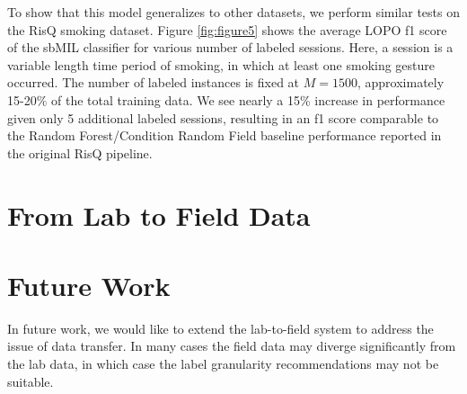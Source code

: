 \documentclass{sigchi}
\begin{document}
To show that this model generalizes to other datasets, we perform similar tests on the RisQ smoking dataset. Figure \ref{fig:figure5} shows the average LOPO f1 score of the sbMIL classifier for various number of labeled sessions. Here, a session is a variable length time period of smoking, in which at least one smoking gesture occurred. The number of labeled instances is fixed at $M = 1500$, approximately 15-20\% of the total training data. We see nearly a 15\% increase in performance given only 5 additional labeled sessions, resulting in an f1 score comparable to the Random Forest/Condition Random Field baseline performance reported in the original RisQ pipeline.

\section{From Lab to Field Data}






\section{Future Work}

In future work, we would like to extend the lab-to-field system to address the issue of data transfer. In many cases the field data may diverge significantly from the lab data, in which case the label granularity recommendations may not be suitable.
\end{document}
